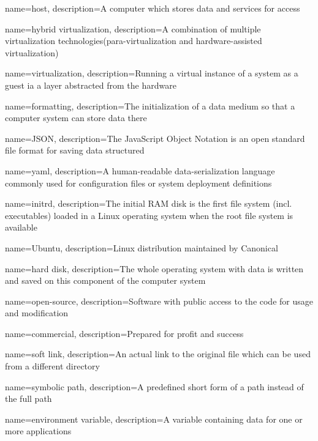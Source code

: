 {
    name={host},
    description={A computer which stores data and services for access}
}

{
    name={hybrid virtualization},
    description={A combination of multiple virtualization technologies(para-virtualization and hardware-assisted virtualization)}
}

{
    name={virtualization},
    description={Running a virtual instance of a system as a guest ia a layer abstracted from the hardware}
}

{
    name={formatting},
    description={The initialization of a data medium so that a computer system can store data there}
}

{
    name={JSON},
    description={The JavaScript Object Notation is an open standard file format for saving data structured}
}

{
    name={yaml},
    description={A human-readable data-serialization language commonly used for configuration files or system deployment definitions}
}

{
    name={initrd},
    description={The initial RAM disk is the first file system (incl. executables) loaded in a Linux operating system when the root file system is available}
}

{
    name={Ubuntu},
    description={Linux distribution maintained by Canonical}
}

{
    name={hard disk},
    description={The whole operating system with data is written and saved on this component of the computer system}
}

{
    name={open-source},
    description={Software with public access to the code for usage and modification}
}

{
    name={commercial},
    description={Prepared for profit and success}
}

{
    name={soft link},
    description={An actual link to the original file which can be used from a different directory}
}

{
    name={symbolic path},
    description={A predefined short form of a path instead of the full path}
}

{
    name={environment variable},
    description={A variable containing data for one or more applications}
}

